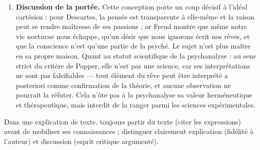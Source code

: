 \documentclass[11pt]{article}
\begin{document}
\begin{corrige}
\begin{enumerate}
\item \textbf{Discussion de la portée.} Cette conception porte un coup décisif à l'idéal cartésien : pour Descartes, la pensée est transparente à elle-même et la raison peut se rendre maîtresse de ses passions ; or Freud montre que même notre vie nocturne nous échappe, qu'un désir que nous ignorons écrit nos rêves, et que la conscience n'est qu'une partie de la psyché. Le sujet n'est plus maître en sa propre maison. Quant au statut scientifique de la psychanalyse : au sens strict du critère de Popper, elle n'est pas une science, car ses interprétations ne sont pas falsifiables — tout élément du rêve peut être interprété a posteriori comme confirmation de la théorie, et aucune observation ne pourrait la réfuter. Cela n'ôte pas à la psychanalyse sa valeur herméneutique et thérapeutique, mais interdit de la ranger parmi les sciences expérimentales.
\end{enumerate}
\end{corrige}

\begin{attention}
Dans une explication de texte, toujours partir du texte (citer les expressions) avant de mobiliser ses connaissances ; distinguer clairement explication (fidélité à l'auteur) et discussion (esprit critique argumenté).
\end{attention}
\end{document}

